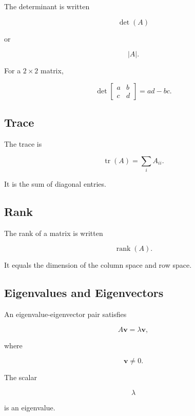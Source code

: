 The determinant is written

\[
\boxed{
\det(A)
}
\]

or

\[
\boxed{
|A|.
}
\]

For a \(2\times2\) matrix,

\[
\boxed{
\det
\begin{bmatrix}
a & b\\
c & d
\end{bmatrix}
=
ad-bc.
}
\]

\subsection{Trace}
\label{subsec:trace-symbol-reference}

The trace is

\[
\boxed{
\operatorname{tr}(A)
=
\sum_iA_{ii}.
}
\]

It is the sum of diagonal entries.

\subsection{Rank}
\label{subsec:rank-symbol-reference}

The rank of a matrix is written

\[
\boxed{
\operatorname{rank}(A).
}
\]

It equals the dimension of the column space and row space.

\subsection{Eigenvalues and Eigenvectors}
\label{subsec:eigenvalue-notation-reference}

An eigenvalue-eigenvector pair satisfies

\[
\boxed{
A\mathbf{v}
=
\lambda\mathbf{v},
}
\]

where

\[
\mathbf{v}\neq0.
\]

The scalar

\[
\lambda
\]

is an eigenvalue.

